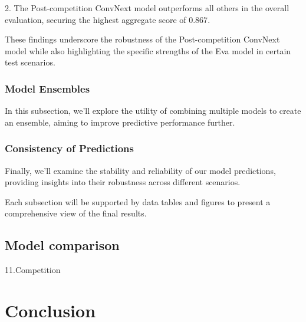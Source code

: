 \documentclass[a4paper,12pt,openright]{book}
\begin{document}
2. The Post-competition ConvNext model outperforms all others in the overall evaluation, securing the highest aggregate score of \(0.867\).

These findings underscore the robustness of the Post-competition ConvNext model while also highlighting the specific strengths of the Eva model in certain test scenarios.


\subsection{Model Ensembles}
In this subsection, we'll explore the utility of combining multiple models to create an ensemble, aiming to improve predictive performance further.

\subsection{Consistency of Predictions}
Finally, we'll examine the stability and reliability of our model predictions, providing insights into their robustness across different scenarios.

Each subsection will be supported by data tables and figures to present a comprehensive view of the final results.
\section{Model comparison}

11.Competition

\chapter{Conclusion}
\label{ch4}



\raggedright


\printbibliography[heading=bibintoc,type=article,title={Journal articles}]

\printbibliography[heading=bibintoc,type=inproceedings,title={Articles in Proceedings}]

\printbibliography[heading=bibintoc,type=incollection,title={Chapters in books}]

\printbibliography[heading=bibintoc,title={Literature}]
\end{document}
